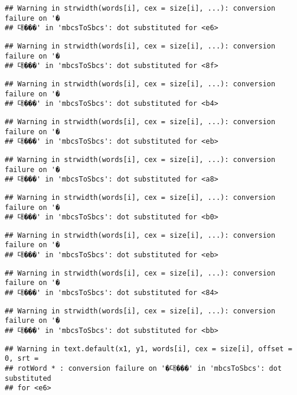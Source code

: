\documentclass[]{article}
\begin{document}
\begin{verbatim}
## Warning in strwidth(words[i], cex = size[i], ...): conversion failure on '�
## 대���' in 'mbcsToSbcs': dot substituted for <e6>
\end{verbatim}

\begin{verbatim}
## Warning in strwidth(words[i], cex = size[i], ...): conversion failure on '�
## 대���' in 'mbcsToSbcs': dot substituted for <8f>
\end{verbatim}

\begin{verbatim}
## Warning in strwidth(words[i], cex = size[i], ...): conversion failure on '�
## 대���' in 'mbcsToSbcs': dot substituted for <b4>
\end{verbatim}

\begin{verbatim}
## Warning in strwidth(words[i], cex = size[i], ...): conversion failure on '�
## 대���' in 'mbcsToSbcs': dot substituted for <eb>
\end{verbatim}

\begin{verbatim}
## Warning in strwidth(words[i], cex = size[i], ...): conversion failure on '�
## 대���' in 'mbcsToSbcs': dot substituted for <a8>
\end{verbatim}

\begin{verbatim}
## Warning in strwidth(words[i], cex = size[i], ...): conversion failure on '�
## 대���' in 'mbcsToSbcs': dot substituted for <b0>
\end{verbatim}

\begin{verbatim}
## Warning in strwidth(words[i], cex = size[i], ...): conversion failure on '�
## 대���' in 'mbcsToSbcs': dot substituted for <eb>
\end{verbatim}

\begin{verbatim}
## Warning in strwidth(words[i], cex = size[i], ...): conversion failure on '�
## 대���' in 'mbcsToSbcs': dot substituted for <84>
\end{verbatim}

\begin{verbatim}
## Warning in strwidth(words[i], cex = size[i], ...): conversion failure on '�
## 대���' in 'mbcsToSbcs': dot substituted for <bb>
\end{verbatim}

\begin{verbatim}
## Warning in text.default(x1, y1, words[i], cex = size[i], offset = 0, srt =
## rotWord * : conversion failure on '�대���' in 'mbcsToSbcs': dot substituted
## for <e6>
\end{verbatim}
\end{document}
